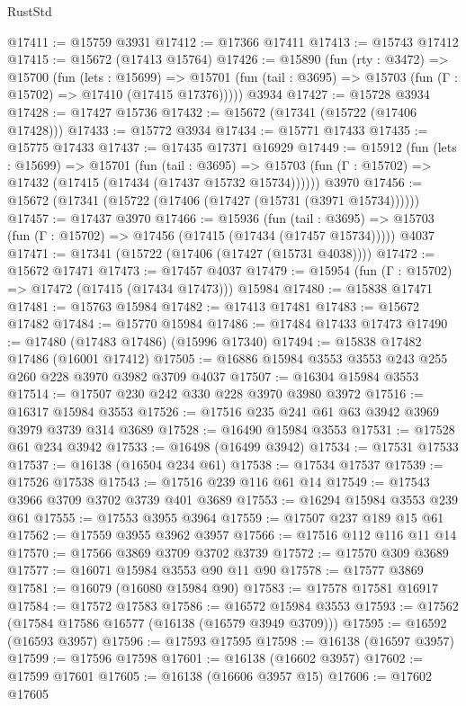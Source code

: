 \begin{lexlean}{RustStd}
\begin{coremodule}
@17411 := @15759 @3931
@17412 := @17366 @17411
@17413 := @15743 @17412
@17415 := @15672 (@17413 @15764)
@17426 := @15890
    (fun (rty : @3472) =>
    @15700
      (fun (lets : @15699) =>
      @15701 (fun (tail : @3695) => @15703 (fun (Γ : @15702) => @17410 (@17415 @17376)))))
    @3934
@17427 := @15728 @3934
@17428 := @17427 @15736
@17432 := @15672 (@17341 (@15722 (@17406 @17428)))
@17433 := @15772 @3934
@17434 := @15771 @17433
@17435 := @15775 @17433
@17437 := @17435 @17371 @16929
@17449 := @15912
    (fun (lets : @15699) =>
    @15701
      (fun (tail : @3695) =>
      @15703 (fun (Γ : @15702) => @17432 (@17415 (@17434 (@17437 @15732 @15734))))))
    @3970
@17456 := @15672 (@17341 (@15722 (@17406 (@17427 (@15731 (@3971 @15734))))))
@17457 := @17437 @3970
@17466 := @15936
    (fun (tail : @3695) => @15703 (fun (Γ : @15702) => @17456 (@17415 (@17434 (@17457 @15734)))))
    @4037
@17471 := @17341 (@15722 (@17406 (@17427 (@15731 @4038))))
@17472 := @15672 @17471
@17473 := @17457 @4037
@17479 := @15954 (fun (Γ : @15702) => @17472 (@17415 (@17434 @17473))) @15984
@17480 := @15838 @17471
@17481 := @15763 @15984
@17482 := @17413 @17481
@17483 := @15672 @17482
@17484 := @15770 @15984
@17486 := @17484 @17433 @17473
@17490 := @17480 (@17483 @17486) (@15996 @17340)
@17494 := @15838 @17482 @17486 (@16001 @17412)
@17505 := @16886 @15984 @3553 @3553 @243 @255 @260 @228 @3970 @3982 @3709 @4037
@17507 := @16304 @15984 @3553
@17514 := @17507 @230 @242 @330 @228 @3970 @3980 @3972
@17516 := @16317 @15984 @3553
@17526 := @17516 @235 @241 @61 @63 @3942 @3969 @3979 @3739 @314 @3689
@17528 := @16490 @15984 @3553
@17531 := @17528 @61 @234 @3942
@17533 := @16498 (@16499 @3942)
@17534 := @17531 @17533
@17537 := @16138 (@16504 @234 @61)
@17538 := @17534 @17537
@17539 := @17526 @17538
@17543 := @17516 @239 @116 @61 @14
@17549 := @17543 @3966 @3709 @3702 @3739 @401 @3689
@17553 := @16294 @15984 @3553 @239 @61
@17555 := @17553 @3955 @3964
@17559 := @17507 @237 @189 @15 @61
@17562 := @17559 @3955 @3962 @3957
@17566 := @17516 @112 @116 @11 @14
@17570 := @17566 @3869 @3709 @3702 @3739
@17572 := @17570 @309 @3689
@17577 := @16071 @15984 @3553 @90 @11 @90
@17578 := @17577 @3869
@17581 := @16079 (@16080 @15984 @90)
@17583 := @17578 @17581 @16917
@17584 := @17572 @17583
@17586 := @16572 @15984 @3553
@17593 := @17562 (@17584 @17586 @16577 (@16138 (@16579 @3949 @3709)))
@17595 := @16592 (@16593 @3957)
@17596 := @17593 @17595
@17598 := @16138 (@16597 @3957)
@17599 := @17596 @17598
@17601 := @16138 (@16602 @3957)
@17602 := @17599 @17601
@17605 := @16138 (@16606 @3957 @15)
@17606 := @17602 @17605

\end{coremodule}
\end{lexlean}

